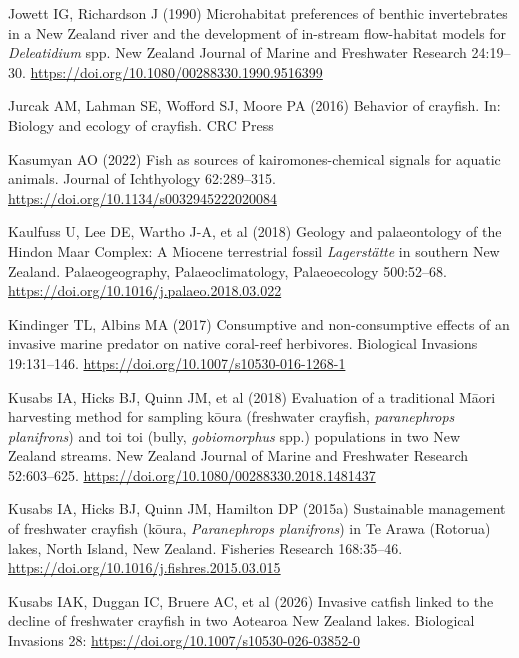 \documentclass[
  12pt,
  a4paper,
  oneside]{scrbook}
\newlength{\cslhangindent}
\newenvironment{CSLReferences}[2] %
 {\begin{list}{}{%
  \setlength{\itemindent}{0pt}
  \setlength{\leftmargin}{0pt}
  \setlength{\parsep}{0pt}
  \ifodd #1
   \setlength{\leftmargin}{\cslhangindent}
   \setlength{\itemindent}{-1\cslhangindent}
  \fi
  \setlength{\itemsep}{#2\baselineskip}}}
 {\end{list}}
\begin{document}
\begin{CSLReferences}{1}{1}
Jowett IG, Richardson J (1990) Microhabitat preferences of benthic
invertebrates in a {New Zealand} river and the development of in-stream
flow-habitat models for {\emph{Deleatidium}} spp. New Zealand Journal of
Marine and Freshwater Research 24:19--30.
\url{https://doi.org/10.1080/00288330.1990.9516399}

Jurcak AM, Lahman SE, Wofford SJ, Moore PA (2016) Behavior of crayfish.
In: Biology and ecology of crayfish. CRC Press

Kasumyan AO (2022) Fish as sources of kairomones-chemical signals for
aquatic animals. Journal of Ichthyology 62:289--315.
\url{https://doi.org/10.1134/s0032945222020084}

Kaulfuss U, Lee DE, Wartho J-A, et al (2018) Geology and palaeontology
of the {Hindon Maar Complex}: A {Miocene} terrestrial fossil
{\emph{Lagerstätte}} in southern {New Zealand}. Palaeogeography,
Palaeoclimatology, Palaeoecology 500:52--68.
\url{https://doi.org/10.1016/j.palaeo.2018.03.022}

Kindinger TL, Albins MA (2017) Consumptive and non-consumptive effects
of an invasive marine predator on native coral-reef herbivores.
Biological Invasions 19:131--146.
\url{https://doi.org/10.1007/s10530-016-1268-1}

Kusabs IA, Hicks BJ, Quinn JM, et al (2018) Evaluation of a traditional
{Māori} harvesting method for sampling kōura (freshwater crayfish,
\emph{paranephrops planifrons}) and toi toi (bully, \emph{gobiomorphus}
spp.) populations in two {New Zealand} streams. New Zealand Journal of
Marine and Freshwater Research 52:603--625.
\url{https://doi.org/10.1080/00288330.2018.1481437}

Kusabs IA, Hicks BJ, Quinn JM, Hamilton DP (2015a) Sustainable
management of freshwater crayfish (kōura, {\emph{Paranephrops
planifrons}}) in {Te Arawa} ({Rotorua}) lakes, {North Island}, {New
Zealand}. Fisheries Research 168:35--46.
\url{https://doi.org/10.1016/j.fishres.2015.03.015}

Kusabs IAK, Duggan IC, Bruere AC, et al (2026) Invasive catfish linked
to the decline of freshwater crayfish in two {Aotearoa New Zealand}
lakes. Biological Invasions 28:
\url{https://doi.org/10.1007/s10530-026-03852-0}


\end{CSLReferences}
\end{document}
